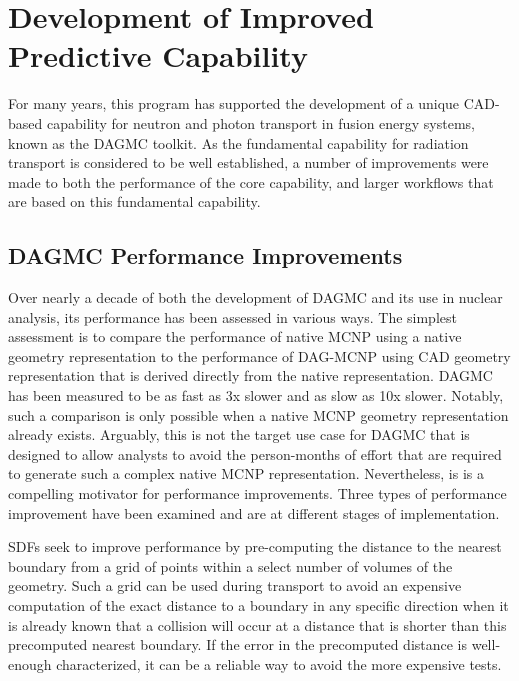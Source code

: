 \section{Development of Improved Predictive Capability}



For many years, this program has supported the development of a unique
CAD-based capability for neutron and photon transport in fusion energy
systems, known as the \gls{DAGMC} toolkit.  As the fundamental capability for
radiation transport is considered to be well established, a number of
improvements were made to both the performance of the core capability, and
larger workflows that are based on this fundamental capability.

\subsection{\gls{DAGMC} Performance Improvements}

Over nearly a decade of both the development of \gls{DAGMC} and its use in
nuclear analysis, its performance has been assessed in various ways.  The
simplest assessment is to compare the performance of native MCNP using a
native geometry representation to the performance of DAG-MCNP using CAD
geometry representation that is derived directly from the native
representation.  \gls{DAGMC} has been measured to be as fast as \textapprox 3x
slower and as slow as \textapprox 10x slower.  Notably, such a comparison is
only possible when a native MCNP geometry representation already exists.
Arguably, this is not the target use case for \gls{DAGMC} that is designed to
allow analysts to avoid the person-months of effort that are required to
generate such a complex native MCNP representation.  Nevertheless, is is a
compelling motivator for performance improvements.  Three types of performance
improvement have been examined and are at different stages of implementation.

\glspl{SDF} seek to improve performance by pre-computing the distance to the
nearest boundary from a grid of points within a select number of volumes of
the geometry.  Such a grid can be used during transport to avoid an expensive
computation of the exact distance to a boundary in any specific direction when
it is already known that a collision will occur at a distance that is shorter
than this precomputed nearest boundary.  If the error in the precomputed
distance is well-enough characterized, it can be a reliable way to avoid the
more expensive tests.

